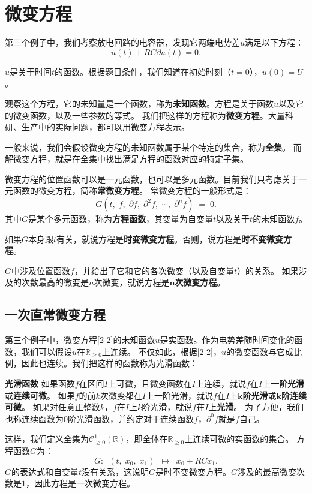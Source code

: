 \documentclass[12pt,UTF8,fontset=none]{ctexbook}
\begin{document}
\section{微变方程}

第三个例子中，我们考察放电回路的电容器，发现它两端电势差$u$满足以下方程：
\begin{equation}
    u(t) + RC\partial  u(t) = 0. \label{2-2}
\end{equation}

$u$是关于时间$t$的函数。根据题目条件，我们知道在初始时刻（$t=0$），$u(0) = U$。

观察这个方程，它的未知量是一个函数，称为\textbf{未知函数}。方程是关于函数$u$以及它的微变函数，以及一些参数的等式。
我们把这样的方程称为\textbf{微变方程}。大量科研、生产中的实际问题，都可以用微变方程表示。

一般来说，我们会假设微变方程的未知函数属于某个特定的集合，称为\textbf{全集}。
而解微变方程，就是在全集中找出满足方程的函数对应的特定子集。

微变方程的位置函数可以是一元函数，也可以是多元函数。目前我们只考虑关于一元函数的微变方程，简称\textbf{常微变方程}。
常微变方程的一般形式是：
$$ G(t, \; f, \; \partial f, \; \partial^2 f, \; \cdots , \; \partial^n f)\;  =\;  0.$$
其中$G$是某个多元函数，称为\textbf{方程函数}，其变量为自变量$t$以及关于$t$的未知函数$f$。

如果$G$本身跟$t$有关，就说方程是\textbf{时变微变方程}。否则，说方程是\textbf{时不变微变方程}。

$G$中涉及位置函数$f$，并给出了它和它的各次微变（以及自变量$t$）的关系。
如果涉及的次数最高的微变是$n$次微变，就说方程是$\boldsymbol{n}$\textbf{次微变方程}。

\subsection{一次直常微变方程}
第三个例子中，微变方程\eqref{2-2}的未知函数$u$是实函数。作为电势差随时间变化的函数，我们可以假设$u$在$\mathbb{R}_{\geqslant 0}$上连续。
不仅如此，根据\eqref{2-2}，$u$的微变函数与它成比例，因此也连续。我们把这样的函数称为光滑函数：
\begin{df}{\textbf{光滑函数}}
    如果函数$f$在区间$I$上可微，且微变函数在$I$上连续，就说$f$在$I$上\textbf{一阶光滑}或\textbf{连续可微}。
    如果$f$的前$k$次微变都在$I$上一阶光滑，就说$f$在$I$上$\boldsymbol{k}$\textbf{阶光滑}或$\boldsymbol{k}$\textbf{阶连续可微}。
    如果对任意正整数$k$，$f$在$I$上$k$阶光滑，就说$f$在$I$上\textbf{光滑}。
    为了方便，我们也称连续函数为$0$阶光滑函数，并约定对于连续函数$f$，$\partial^0 f$就是$f$自己。
\end{df}
这样，我们定义全集为$\mathcal{C}^1_{\geqslant 0}(\mathbb{R})$，即全体在$\mathbb{R}_{\geqslant 0}$上连续可微的实函数的集合。
方程函数$G$为：
$$ G: \,\,\,(t, \; x_0, \; x_1) \,\,\, \mapsto \,\,\, x_0 + RC x_1. $$
$G$的表达式和自变量$t$没有关系，这说明$G$是时不变微变方程。$G$涉及的最高微变次数是$1$，因此方程是一次微变方程。
\end{document}
